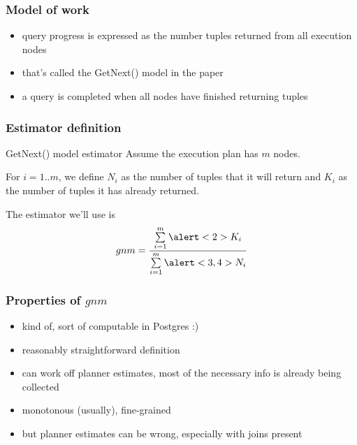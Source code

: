 \documentclass{beamer}
\begin{document}
\begin{frame}
  \frametitle{Model of work}

  \begin{itemize}
  \item query progress is expressed as the number tuples returned from all
    execution nodes
  \item that's called the GetNext() model in the paper
  \item a query is completed when all nodes have finished returning tuples
  \end{itemize}
\end{frame}

\begin{frame}
  \frametitle{Estimator definition}

  \begin{block}{GetNext() model estimator}
    Assume the execution plan has $m$ nodes.

    \bigskip

    For $i = 1..m$, we define \alert<3>{$N_{i}$} as the number of tuples that
    it \alert<3>{will return} and \alert<2>{$K_{i}$} as the number of tuples it
    \alert<2>{has already returned}.

    \bigskip

    The estimator we'll use is
    \begin{equation*}
      gnm = \frac{\sum\limits_{i=1}^{m} \alert<2>{K_{i}}}
      {\sum\limits_{i=1}^{m} \alert<3,4>{N_{i}}}
    \end{equation*}

    \bigskip

  \end{block}
\end{frame}

\begin{frame}
  \frametitle{Properties of $gnm$}

  \begin{itemize}
  \item kind of, sort of computable in Postgres :)
  \item reasonably straightforward definition
  \item can work off planner estimates, most of the necessary info is already
    being collected
  \item monotonous (usually), fine-grained
  \item but planner estimates can be wrong, especially with joins present
  \end{itemize}
\end{frame}
\end{document}
